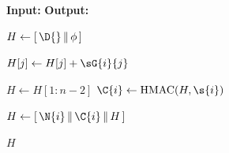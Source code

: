 \caption{Encryption (Fig.~\ref{fig:chunk-encryption})}
\begin{algorithmic}[1]
  
\vspace{1pt}
\Statex \hspace{-6mm}\textbf{Input:}
\Statex {} \vspace{5pt}
\Statex \hspace{-6mm}\textbf{Output:}
\Statex {}
\Statex

\State $H \gets [\,\D{} \,\|\, \phi\,]$   %

        \State $H[j] \gets H[j] + \sG{i}{j}$
    \EndFor

    \State $H \gets H[1 : n-2]$  %
    \State $\C{i} \gets \text{HMAC}(H, \s{i})$   %

    \State $H \gets [\,\N{i} \,\|\, \C{i} \,\|\, H\,]$  %
\EndFor

\State \Return $H$

\end{algorithmic}
